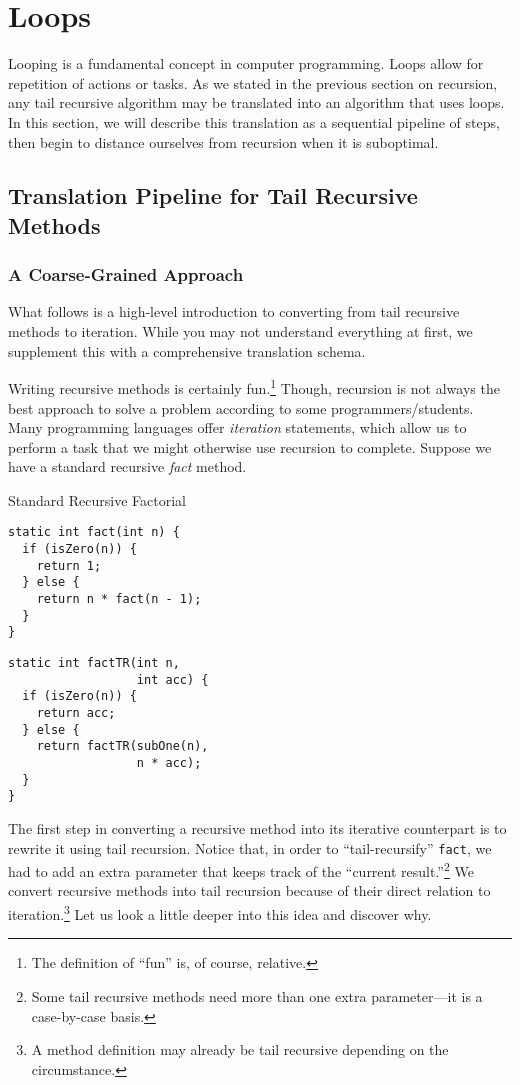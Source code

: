 \section{Loops}

Looping is a fundamental concept in computer programming. 
Loops allow for repetition of actions or tasks. 
As we stated in the previous section on recursion, any tail recursive algorithm may be translated into an algorithm that uses loops. 
In this section, we will describe this translation as a sequential pipeline of steps, then begin to distance ourselves from recursion when it is suboptimal.

\subsection{Translation Pipeline for Tail Recursive Methods}
\subsubsection*{A Coarse-Grained Approach}
What follows is a high-level introduction to converting from tail recursive methods to iteration. 
While you may not understand everything at first, we supplement this with a comprehensive translation schema.

Writing recursive methods is certainly fun.\footnote{The definition of ``fun'' is, of course, relative.} 
Though, recursion is not always the best approach to solve a problem according to some programmers/students. 
Many programming languages offer \emph{iteration} statements, which allow us to perform a task that we might otherwise use recursion to complete. 
Suppose we have a standard recursive \emph{fact} method. 

\begin{clrr}[]{Standard Recursive Factorial}
\begin{lstlisting}[language=MyJavaNF]
static int fact(int n) {
  if (isZero(n)) { 
    return 1; 
  } else {
    return n * fact(n - 1);
  }
}
\end{lstlisting}
\tcblower
\begin{lstlisting}[language=MyJavaNF]
static int factTR(int n, 
                  int acc) {
  if (isZero(n)) { 
    return acc; 
  } else {
    return factTR(subOne(n), 
                  n * acc);
  }
}
\end{lstlisting}
\end{clrr}

The first step in converting a recursive method into its iterative counterpart is to rewrite it using tail recursion. 
Notice that, in order to ``tail-recursify'' \texttt{fact}, we had to add an extra parameter that keeps track of the ``current result.''\footnote{Some tail recursive methods need more than one extra parameter---it is a case-by-case basis.} 
We convert recursive methods into tail recursion because of their direct relation to iteration.\footnote{A method definition may already be tail recursive depending on the circumstance.} 
Let us look a little deeper into this idea and discover why.

